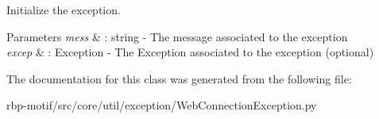 Initialize the exception. 


\begin{DoxyParams}{Parameters}
{\em mess} & \-: string -\/ The message associated to the exception \\
\hline
{\em excep} & \-: Exception -\/ The Exception associated to the exception (optional) \\
\hline
\end{DoxyParams}


The documentation for this class was generated from the following file\-:\begin{DoxyCompactItemize}
\item 
rbp-\/motif/src/core/util/exception/Web\-Connection\-Exception.\-py\end{DoxyCompactItemize}
